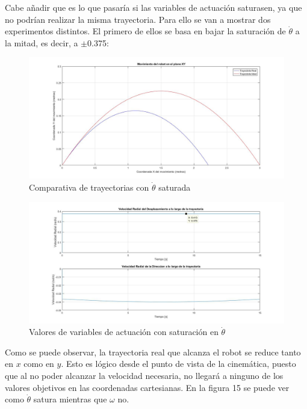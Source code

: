 \documentclass[a4paper,twoside]{article}
\begin{document}
	Cabe añadir que es lo que pasaría si las variables de actuación saturasen, ya que no podrían realizar la misma trayectoria. Para ello se van a mostrar dos experimentos distintos. El primero de ellos se basa en bajar la saturación de $\dot{\theta}$ a la mitad, es decir, a $\pm$0.375:
	
	\begin{figure}[H]
		\centering
		\includegraphics[width=1\textwidth]{parab_4}
		\caption{Comparativa de trayectorias con $\dot{\theta}$ saturada}
	\end{figure}
	
	\begin{figure}[H]
		\centering
		\includegraphics[width=1\textwidth]{parab_5}
		\caption{Valores de variables de actuación con saturación en $\dot{\theta}$}
	\end{figure}
	
	Como se puede observar, la trayectoria real que alcanza el robot se reduce tanto en $x$ como en $y$. Esto es lógico desde el punto de vista de la cinemática, puesto que al no poder alcanzar la velocidad necesaria, no llegará a ninguno de los valores objetivos en las coordenadas cartesianas. En la figura 15 se puede ver como $\dot{\theta}$ satura mientras que $\omega$ no.\\
	
\end{document}
